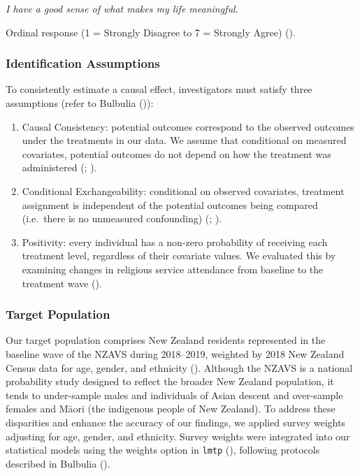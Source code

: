 \documentclass[
  single column]{article}
\begin{document}
\emph{I have a good sense of what makes my life meaningful.}

Ordinal response (1 = Strongly Disagree to 7 = Strongly Agree)
().

\subsubsection{Identification
Assumptions}\label{identification-assumptions}

To consistently estimate a causal effect, investigators must satisfy
three assumptions (refer to Bulbulia
()):

\begin{enumerate}
\def\labelenumi{\arabic{enumi}.}
\item
  Causal Consistency: potential outcomes correspond to the observed
  outcomes under the treatments in our data. We assume that conditional
  on measured covariates, potential outcomes do not depend on how the
  treatment was administered (; ).
\item
  Conditional Exchangeability: conditional on observed covariates,
  treatment assignment is independent of the potential outcomes being
  compared (i.e.~there is no unmeasured confounding)
  (;
  ).
\item
  Positivity: every individual has a non-zero probability of receiving
  each treatment level, regardless of their covariate values. We
  evaluated this by examining changes in religious service attendance
  from baseline to the treatment wave
  ().
\end{enumerate}

\subsubsection{Target Population}\label{target-population}

Our target population comprises New Zealand residents represented in the
baseline wave of the NZAVS during 2018--2019, weighted by 2018 New
Zealand Census data for age, gender, and ethnicity
(). Although the NZAVS is a
national probability study designed to reflect the broader New Zealand
population, it tends to under-sample males and individuals of Asian
descent and over-sample females and Māori (the indigenous people of New
Zealand). To address these disparities and enhance the accuracy of our
findings, we applied survey weights adjusting for age, gender, and
ethnicity. Survey weights were integrated into our statistical models
using the weights option in \texttt{lmtp}
(), following
protocols described in Bulbulia
().
\end{document}
